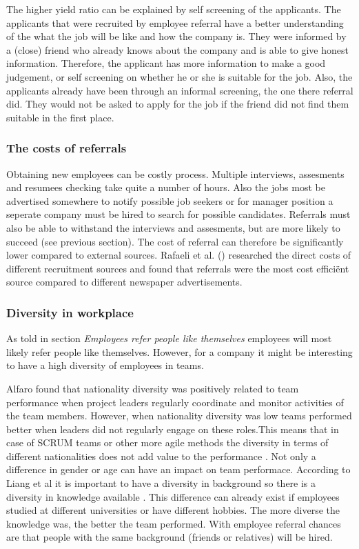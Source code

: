 \documentclass[Main.tex]{subfiles}
\begin{document}
The higher yield ratio can be explained by self screening of the applicants. The applicants that were recruited by employee referral have a better understanding of the what the job will be like and how the company is. They were informed by a (close) friend who already knows about the company and is able to give honest information. Therefore, the applicant has more information to make a good judgement, or self screening on whether he or she is suitable for the job. Also, the applicants already have been through an informal screening, the one there referral did. They would not be asked to apply for the job if the friend did not find them suitable in the first place. 

\subsubsection*{The costs of referrals}

Obtaining new employees can be costly process. Multiple interviews, assesments and resumees checking take quite a number of hours. Also the jobs most be advertised somewhere to notify possible job seekers or for manager position a seperate company must be hired to search for possible candidates. Referrals  must also be able to withstand the interviews and assesments, but are more likely to succeed (see previous section). The cost of referral can therefore be significantly lower compared to external sources. Rafaeli et al. (\cite{fourth}) researched the direct costs of different recruitment sources and found that referrals were the most cost efficiënt source compared to different newspaper advertisements.


\subsubsection*{Diversity in workplace}
As told in section \emph{Employees refer people like themselves} employees will most likely refer people like themselves. However, for a company it might be interesting to have a high diversity of employees in teams. 

Alfaro found that nationality diversity was positively related to team performance when project leaders regularly coordinate and monitor activities of the team members. However, when nationality diversity was low teams performed better when leaders did 
not regularly engage on these roles.This means that in case of SCRUM teams or other more agile methods the diversity in terms of different nationalities does not add value to the performance \cite{diversity}.
Not only a difference in gender or age can have an impact on team performace. According to Liang et al it is important to have a diversity in background so there is a diversity in knowledge available \cite{teamdiversity}. This difference can already exist if employees studied at different universities or have different hobbies. The more diverse the knowledge was, the better the team performed. With employee referral chances are that people with the same background (friends or relatives) will be hired. 
\end{document}
